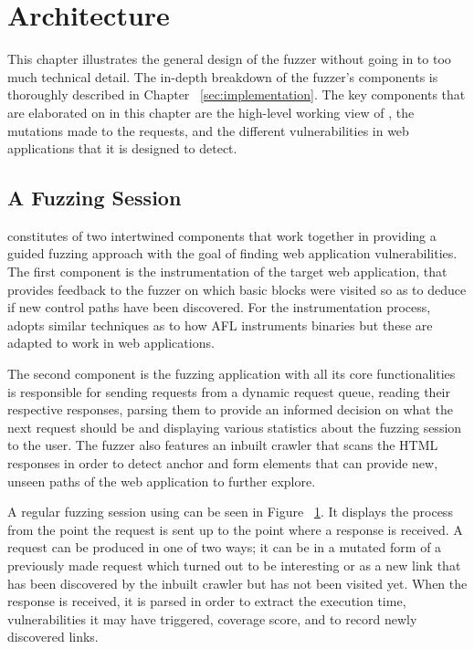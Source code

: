 \chapter{Architecture}
\label{sec:architecture}
\minitoc
\vspace*{1cm}

This chapter illustrates the general design of the fuzzer without going in to too much technical detail. The in-depth breakdown of the fuzzer's components is thoroughly described in Chapter ~\ref{sec:implementation}. The key components that are elaborated on in this chapter are the high-level working view of \pname{}, the mutations made to the requests, and the different vulnerabilities in web applications that \pname{} it is designed to detect.

\section{A Fuzzing Session}
\pname{} constitutes of two intertwined components that work together in providing a guided fuzzing approach with the goal of finding web application vulnerabilities. The first
component is the instrumentation of the target web application, that provides feedback to the fuzzer on which basic blocks were visited so as to deduce if new control paths have been discovered. For the instrumentation process, \pname{} adopts similar techniques as to how AFL instruments binaries but these are adapted to work in web applications. 

The second component is the fuzzing application with all its core functionalities is responsible for sending requests from a dynamic request queue, reading their respective responses, parsing them to provide an informed decision on what the next request should be and displaying various statistics about the fuzzing session to the user. The fuzzer also features an inbuilt crawler that scans the HTML responses in order to detect anchor and form elements that can provide new, unseen paths of the web application to further explore.

A regular fuzzing session using \pname{} can be seen in Figure ~\ref{sec:architecture}. It displays the process from the point the request is sent up to the point where a response is received. A request can be produced in one of two ways; it can be in a mutated form of a previously made request which turned out to be interesting or as a new link that has been discovered by the inbuilt crawler but has not been visited yet. When the response is received, it is parsed in order to extract the execution time, vulnerabilities it may have triggered, coverage score, and to record newly discovered links.

